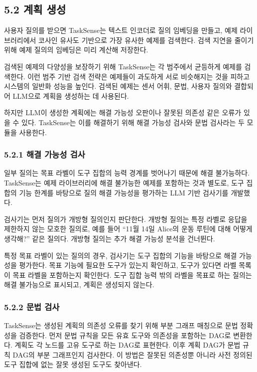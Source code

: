 \documentclass[sigconf,nonacm]{acmart}
\begin{document}
\subsection{5.2 계획 생성}

사용자 질의를 받으면 TaskSense는 텍스트 인코더로 질의 임베딩을 만들고, 예제 라이브러리에서 코사인 유사도 기반으로 가장 유사한 예제를 검색한다. 검색 지연을 줄이기 위해 예제 질의의 임베딩은 미리 계산해 저장한다.

검색된 예제의 다양성을 보장하기 위해 TaskSense는 각 범주에서 균등하게 예제를 검색한다. 이런 범주 기반 검색 전략은 예제들이 과도하게 서로 비슷해지는 것을 피하고 시스템의 일반화 성능을 높인다. 검색된 예제는 센서 어휘, 문법, 사용자 질의와 결합되어 LLM으로 계획을 생성하는 데 사용된다.

하지만 LLM이 생성한 계획에는 해결 가능성 오판이나 잘못된 의존성 같은 오류가 있을 수 있다. TaskSense는 이를 해결하기 위해 해결 가능성 검사와 문법 검사라는 두 모듈을 사용한다.

\subsubsection{5.2.1 해결 가능성 검사}

일부 질의는 목표 라벨이 도구 집합의 능력 경계를 벗어나기 때문에 해결 불가능하다. TaskSense는 예제 라이브러리에 해결 불가능한 예제를 포함하는 것과 별도로, 도구 집합의 기능 한계를 바탕으로 질의 해결 가능성을 평가하는 LLM 기반 검사기를 개발했다.

검사기는 먼저 질의가 개방형 질의인지 판단한다. 개방형 질의는 특정 라벨로 응답을 제한하지 않는 모호한 질의로, 예를 들어 “11월 14일 Alice의 운동 루틴에 대해 어떻게 생각해?” 같은 질의다. 개방형 질의는 추가 해결 가능성 분석을 건너뛴다.

특정 목표 라벨이 있는 질의의 경우, 검사기는 도구 집합의 기능을 바탕으로 해결 가능성을 평가한다. 목표 기능에 필요한 도구가 있는지 확인하고, 도구가 있다면 라벨 목록이 목표 라벨을 포함하는지 확인한다. 도구 집합 능력 밖의 라벨을 목표로 하는 질의는 해결 불가능으로 표시되고, 계획은 생성되지 않는다.

\subsubsection{5.2.2 문법 검사}

TaskSense는 생성된 계획의 의존성 오류를 찾기 위해 부분 그래프 매칭으로 문법 정확성을 검증한다. 먼저 문법 규칙을 모든 유효 도구와 의존성을 포함하는 DAG로 변환한다. 계획도 각 노드를 고유 도구로 하는 DAG로 표현한다. 이후 계획 DAG가 문법 규칙 DAG의 부분 그래프인지 검사한다. 이 방법은 잘못된 의존성뿐 아니라 사전 정의된 도구 집합에 없는 잘못 생성된 도구도 찾아낸다.
\end{document}
